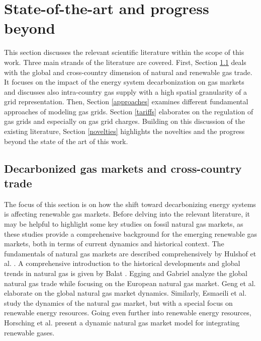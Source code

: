 \section{State-of-the-art and progress beyond}\label{stateoftheart}
This section discusses the relevant scientific literature within the scope of this work. Three main strands of the literature are covered. First, Section \ref{import} deals with the global and cross-country dimension of natural and renewable gas trade. It focuses on the impact of the energy system decarbonization on gas markets and discusses also intra-country gas supply with a high spatial granularity of a grid representation. Then, Section \ref{approaches} examines different fundamental approaches of modeling gas grids. Section \ref{tariffs} elaborates on the regulation of gas grids and especially on gas grid charges. Building on this discussion of the existing literature, Section \ref{novelties} highlights the novelties and the progress beyond the state of the art of this work.

\subsection{Decarbonized gas markets and cross-country trade}\label{import}
The focus of this section is on how the shift toward decarbonizing energy systems is affecting renewable gas markets. Before delving into the relevant literature, it may be helpful to highlight some key studies on fossil natural gas markets, as these studies provide a comprehensive background for the emerging renewable gas markets, both in terms of current dynamics and historical context. The fundamentals of natural gas markets are described comprehensively by Hulshof et al. \cite{hulshof2016market}. A comprehensive introduction to the historical developments and global trends in natural gas is given by  Balat \cite{balat2009global}. Egging and Gabriel \cite{egging2006examining} analyze the global natural gas trade while focusing on the European natural gas market. Geng et al. \cite{geng2014dynamic} elaborate on the global natural gas market dynamics. Similarly, Esmaeili et al. \cite{esmaeili2022system} study the dynamics of the natural gas market, but with a special focus on renewable energy resources. Going even further into renewable energy resources, Horsching et al. \cite{horschig2018decarbonize} present a dynamic natural gas market model for integrating renewable gases.\vspace{0.3cm}

